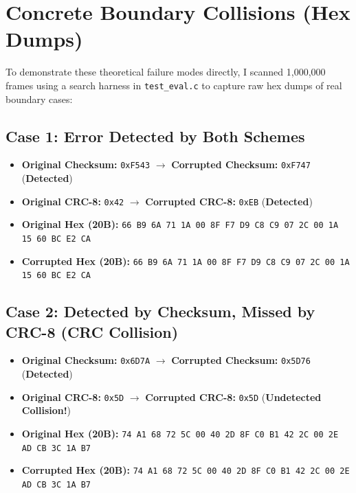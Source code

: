 \documentclass[12pt,a4paper]{article}
\begin{document}
\section{Concrete Boundary Collisions (Hex Dumps)}

To demonstrate these theoretical failure modes directly, I scanned 1,000,000 frames using a search harness in \texttt{test\_eval.c} to capture raw hex dumps of real boundary cases:

\subsection{Case 1: Error Detected by Both Schemes}
\begin{itemize}[leftmargin=*]
    \item \textbf{Original Checksum:} \texttt{0xF543} $\longrightarrow$ \textbf{Corrupted Checksum:} \texttt{0xF747} (\textbf{Detected})
    \item \textbf{Original CRC-8:} \texttt{0x42} $\longrightarrow$ \textbf{Corrupted CRC-8:} \texttt{0xEB} (\textbf{Detected})
    \item \textbf{Original Hex (20B):} \texttt{66 B9 6A 71 1A 00 8F F7 D9 C8 C9 07 2C 00 1A 15 60 BC E2 CA}
    \item \textbf{Corrupted Hex (20B):} \texttt{66 B9 6A 71 1A 00 8F F7 D9 C8 C9 07 2C 00 1A 15 60 BC E2 CA}
\end{itemize}

\subsection{Case 2: Detected by Checksum, Missed by CRC-8 (CRC Collision)}
\begin{itemize}[leftmargin=*]
    \item \textbf{Original Checksum:} \texttt{0x6D7A} $\longrightarrow$ \textbf{Corrupted Checksum:} \texttt{0x5D76} (\textbf{Detected})
    \item \textbf{Original CRC-8:} \texttt{0x5D} $\longrightarrow$ \textbf{Corrupted CRC-8:} \texttt{0x5D} (\textbf{Undetected Collision!})
    \item \textbf{Original Hex (20B):} \texttt{74 A1 68 72 5C 00 40 2D 8F C0 B1 42 2C 00 2E AD CB 3C 1A B7}
    \item \textbf{Corrupted Hex (20B):} \texttt{74 A1 68 72 5C 00 40 2D 8F C0 B1 42 2C 00 2E AD CB 3C 1A B7}
\end{itemize}
\end{document}
